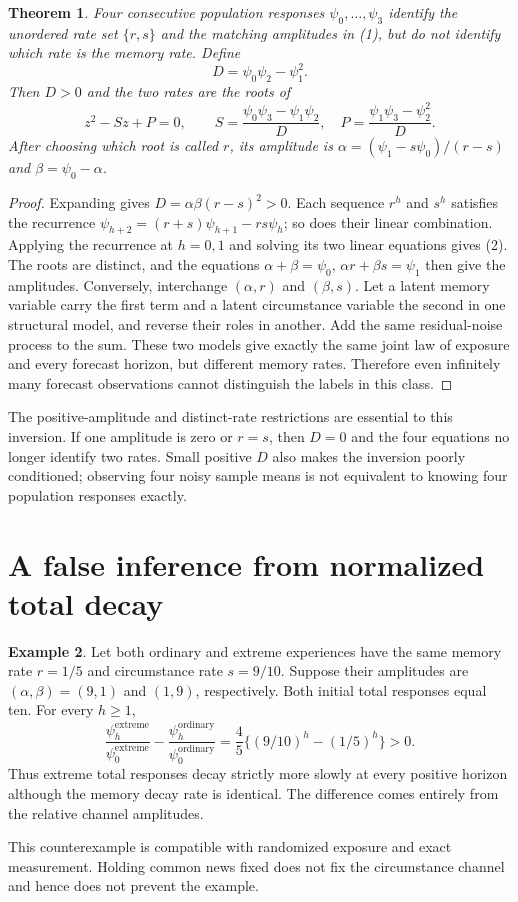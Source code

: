 \documentclass[11pt]{article}
\newtheorem{theorem}{Theorem}
\theoremstyle{definition}
\newtheorem{example}[theorem]{Example}
\begin{document}
\begin{theorem}
Four consecutive population responses $\psi_0,\ldots,\psi_3$ identify
the unordered rate set $\{r,s\}$ and the matching amplitudes in (1),
but do not identify which rate is the memory rate. Define
\[
 D=\psi_0\psi_2-\psi_1^2.
\]
Then $D>0$ and the two rates are the roots of
\[
 z^2-Sz+P=0,\qquad
 S=\frac{\psi_0\psi_3-\psi_1\psi_2}{D},\quad
 P=\frac{\psi_1\psi_3-\psi_2^2}{D}.                      \tag{2}
\]
After choosing which root is called $r$, its amplitude is
$\alpha=(\psi_1-s\psi_0)/(r-s)$ and $\beta=\psi_0-\alpha$.
\end{theorem}
\begin{proof}
Expanding gives $D=\alpha\beta(r-s)^2>0$. Each sequence $r^h$ and
$s^h$ satisfies the recurrence
$\psi_{h+2}=(r+s)\psi_{h+1}-rs\psi_h$; so does their linear
combination. Applying the recurrence at $h=0,1$ and solving its two
linear equations gives (2). The roots are distinct, and the equations
$\alpha+\beta=\psi_0$, $\alpha r+\beta s=\psi_1$ then give the
amplitudes. Conversely, interchange $(\alpha,r)$ and $(\beta,s)$.
Let a latent memory variable carry the first term and a latent
circumstance variable the second in one structural model, and reverse
their roles in another. Add the same residual-noise process to the
sum. These two models give exactly the same joint law of exposure
and every forecast horizon, but different memory rates. Therefore
even infinitely many forecast observations cannot distinguish the labels
in this class.
\end{proof}
The positive-amplitude and distinct-rate restrictions are essential to
this inversion. If one amplitude is zero or $r=s$, then $D=0$ and the
four equations no longer identify two rates. Small positive $D$ also
makes the inversion poorly conditioned; observing four noisy sample
means is not equivalent to knowing four population responses exactly.

\section*{A false inference from normalized total decay}
\begin{example}
Let both ordinary and extreme experiences have the same memory rate
$r=1/5$ and circumstance rate $s=9/10$. Suppose their amplitudes are
$(\alpha,\beta)=(9,1)$ and $(1,9)$, respectively. Both initial total
responses equal ten. For every $h\ge1$,
\[
 \frac{\psi_h^{\mathrm{extreme}}}{\psi_0^{\mathrm{extreme}}}
 -\frac{\psi_h^{\mathrm{ordinary}}}{\psi_0^{\mathrm{ordinary}}}
 =\frac45\{(9/10)^h-(1/5)^h\}>0.
\]
Thus extreme total responses decay strictly more slowly at every positive
horizon although the memory decay rate is identical. The difference
comes entirely from the relative channel amplitudes.
\end{example}
This counterexample is compatible with randomized exposure and exact
measurement. Holding common news fixed does not fix the circumstance
channel and hence does not prevent the example.
\end{document}
